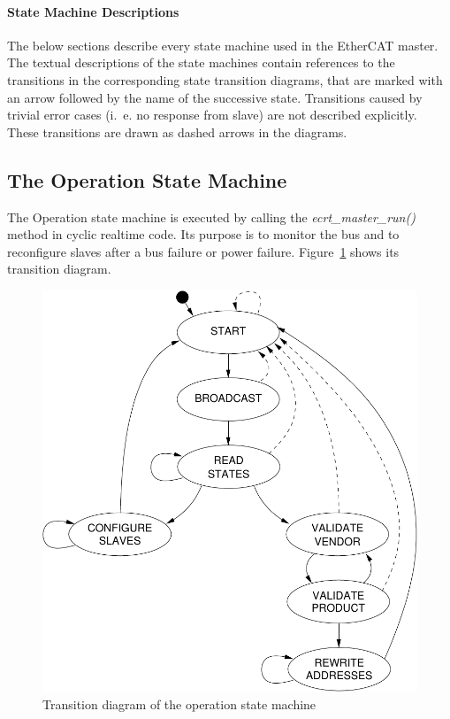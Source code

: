 \documentclass[a4paper,12pt,BCOR6mm,bibtotoc,idxtotoc]{scrbook}
\begin{document}
\paragraph{State Machine Descriptions}

The below sections describe every state machine used in the EtherCAT
master. The textual descriptions of the state machines contain
references to the transitions in the corresponding state transition
diagrams, that are marked with an arrow followed by the name of the
successive state.  Transitions caused by trivial error cases (i.~e. no
response from slave) are not described explicitly. These transitions
are drawn as dashed arrows in the diagrams.


\subsection{The Operation State Machine}
\label{sec:fsm-op}

The Operation state machine is executed by calling the
\textit{ecrt\_master\_run()} method in cyclic realtime code. Its
purpose is to monitor the bus and to reconfigure slaves after a bus
failure or power failure. Figure~\ref{fig:fsm-op} shows its transition
diagram.

\begin{figure}[htbp]
  \centering
  \includegraphics[width=.8\textwidth]{images/fsm-op}
  \caption{Transition diagram of the operation state machine}
  \label{fig:fsm-op}
\end{figure}
\end{document}
